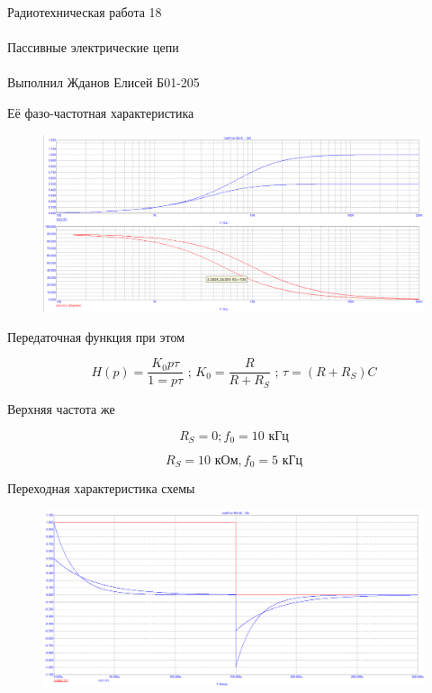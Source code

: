 \documentclass{astroedu-lab}
\begin{document}
\begin{problem}{\huge Радиотехническая работа 18\\\\Пассивные электрические цепи\\\\Выполнил Жданов Елисей Б01-205}
\newpage

 Её фазо-частотная характеристика

\begin{figure}[!h]
	\centering
	\includegraphics[width=1\textwidth]{1_9.png}
	\label{fig:boiler}
\end{figure}

Передаточная функция при этом

\begin{equation}
	H(p) = \frac{K_0 p \tau}{1 = p \tau} \text{ ; } K_0 = \frac{R}{R+R_S} \text{ ; } \tau = (R + R_S) C
\end{equation}

Верхняя частота же

\begin{equation}
	R_S = 0; f_0 = \text{10 кГц}
\end{equation}

\begin{equation}
	R_S = 10 \text{ кОм}, f_0 = 5\text{ кГц}
\end{equation}

Переходная характеристика схемы

\begin{figure}[!h]
	\centering
	\includegraphics[width=1\textwidth]{1_10.png}
	\label{fig:boiler}
\end{figure}


\end{problem}
\end{document}
